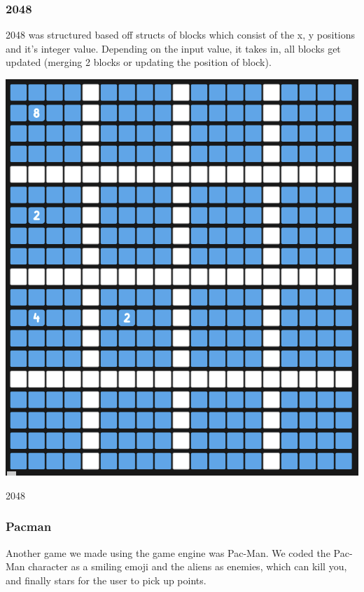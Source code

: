 \documentclass{article}
\begin{document}
\begin{multicols}{2}

\subsubsection{2048}
2048 was structured based off structs of blocks which consist of the x, y positions and it's integer value. Depending on the input value, it takes in, all blocks get updated (merging 2 blocks or updating the position of block).  \\

\begin{minipage}{\linewidth}
    \centering
    \includegraphics[width=0.8\linewidth]{2048.png}
    \captionsetup{type=figure}
    \caption{2048}
    \label{fig:game-engine-example}
\end{minipage}

\subsubsection{Pacman}
Another game we made using the game engine was Pac-Man. We coded the Pac-Man character as a smiling emoji and the aliens as enemies, which can kill you, and finally stars for the user to pick up points.\\


\end{multicols}
\end{document}
